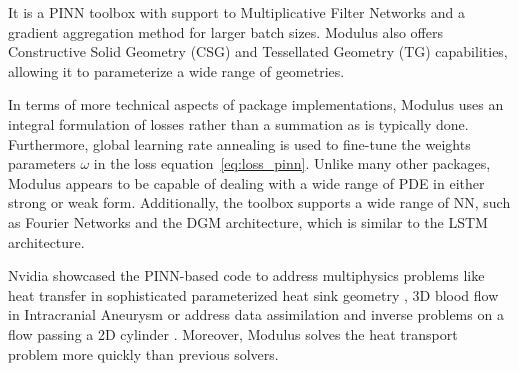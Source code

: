 \documentclass[pdflatex,sn-basic]{sn-jnl}%
\theoremstyle{thmstyleone}%
\theoremstyle{thmstyletwo}%
\theoremstyle{thmstylethree}%
\begin{document}
It is a  PINN toolbox with support to Multiplicative Filter Networks and a gradient aggregation method for larger batch sizes.
Modulus also offers Constructive Solid Geometry (CSG) and Tessellated Geometry (TG) capabilities, allowing it to parameterize a wide range of geometries. 

In terms of more technical aspects of package implementations, Modulus uses an integral formulation of losses rather than a summation as is typically done.
Furthermore, global learning rate annealing is used to fine-tune the weights parameters $\omega$ in the loss equation~\ref{eq:loss_pinn}.
Unlike many other packages, Modulus appears to be capable of dealing with a wide range of PDE in either strong or weak form.
Additionally, the toolbox supports a wide range of NN, such as Fourier Networks and the DGM architecture, which is similar to the LSTM architecture. 


Nvidia showcased the PINN-based code to address multiphysics problems like heat 
transfer in sophisticated parameterized heat sink geometry \citep{Che2021_RecentAdvanceMachine_SeeCS},  3D blood flow in Intracranial Aneurysm or address data assimilation and inverse problems on a flow passing a 2D cylinder \citep{Modulus2021}.
Moreover, Modulus solves the heat transport problem more quickly than previous solvers.
\end{document}
